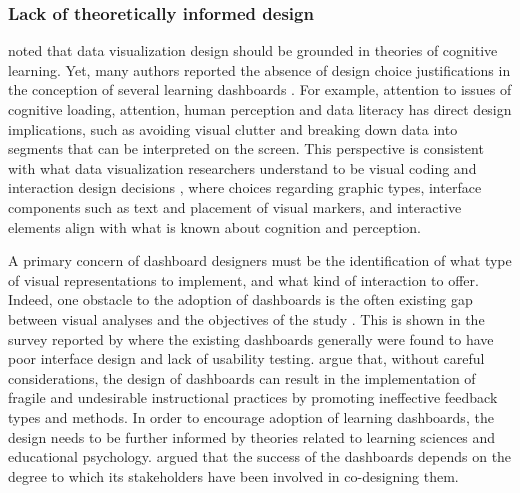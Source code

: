 \documentclass[preprint,12pt]{elsarticle}
\begin{document}
\subsubsection{Lack of theoretically informed design}
\citet{alhadad2018visualizing} noted that data visualization design should be grounded in theories of cognitive learning. Yet, many authors reported  the absence of design choice justifications in the conception of several learning dashboards \citet{Bodily2017}. For example, attention to issues of cognitive loading, attention, human perception and data literacy has direct design implications, such as avoiding visual clutter and breaking down data into segments that can be interpreted on the screen. This perspective is consistent with what data visualization researchers understand to be visual coding and interaction design decisions \citep{munzner2014visualization}, where choices regarding graphic types, interface components such as text and placement of visual markers, and interactive elements align with what is known about cognition and perception.




A primary concern of dashboard designers must be the identification of what type of visual representations to implement, and what kind of interaction to offer. Indeed, one obstacle to the adoption of dashboards is the often existing gap between visual analyses and the objectives of the study  \citep{Roberts2017}. This is shown in the survey reported by \citep{Reimers2015} where the existing dashboards generally were found to have poor interface design and lack of usability testing. 
\citet{Gavsevic2015} argue that, without careful considerations, the design of dashboards can result in the implementation of fragile and undesirable instructional practices by promoting ineffective feedback types and methods. 
In order to encourage adoption of learning dashboards, the design needs to be further informed by theories related to learning sciences and educational psychology. \citet{Holstein2017} argued that the success of the dashboards depends on the degree to which its stakeholders have been involved in co-designing them. 
\end{document}

